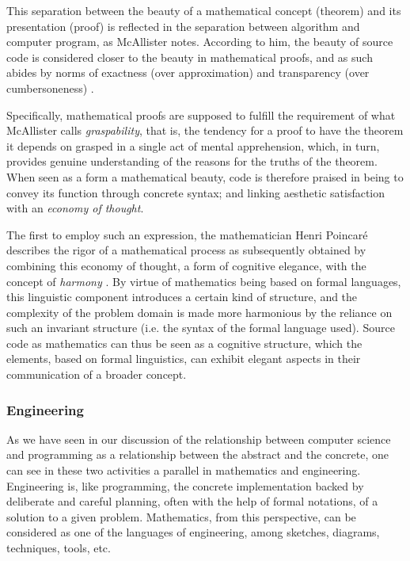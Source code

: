 This separation between the beauty of a mathematical concept (theorem) and its presentation (proof) is reflected in the separation between algorithm and computer program, as McAllister notes. According to him, the beauty of source code is considered closer to the beauty in mathematical proofs, and as such abides by norms of exactness (over approximation) and transparency (over cumbersoneness) \citep{mcallister_mathematical_2005}.

Specifically, mathematical proofs are supposed to fulfill the requirement of what McAllister calls \emph{graspability}, that is, the tendency for a proof to have the theorem it depends on grasped in a single act of mental apprehension, which, in turn, provides genuine understanding of the reasons for the truths of the theorem. When seen as a form a mathematical beauty, code is therefore praised in being to convey its function through concrete syntax; and linking aesthetic satisfaction with an \emph{economy of thought}.

The first to employ such an expression, the mathematician Henri Poincaré describes the rigor of a mathematical process as subsequently obtained by combining this economy of thought, a form of cognitive elegance, with the concept of \emph{harmony} \citep{poincare_science_1908}. By virtue of mathematics being based on formal languages, this linguistic component introduces a certain kind of structure, and the complexity of the problem domain is made more harmonious by the reliance on such an invariant structure (i.e. the syntax of the formal language used). Source code as mathematics can thus be seen as a cognitive structure, which the elements, based on formal linguistics, can exhibit elegant aspects in their communication of a broader concept.

\subsubsection{Engineering}
\label{subsubsec:beauty-engineering}

As we have seen in our discussion of the relationship between computer science and programming as a relationship between the abstract and the concrete, one can see in these two activities a parallel in mathematics and engineering. Engineering is, like programming, the concrete implementation backed by deliberate and careful planning, often with the help of formal notations, of a solution to a given problem. Mathematics, from this perspective, can be considered as one of the languages of engineering, among sketches, diagrams, techniques, tools, etc.

